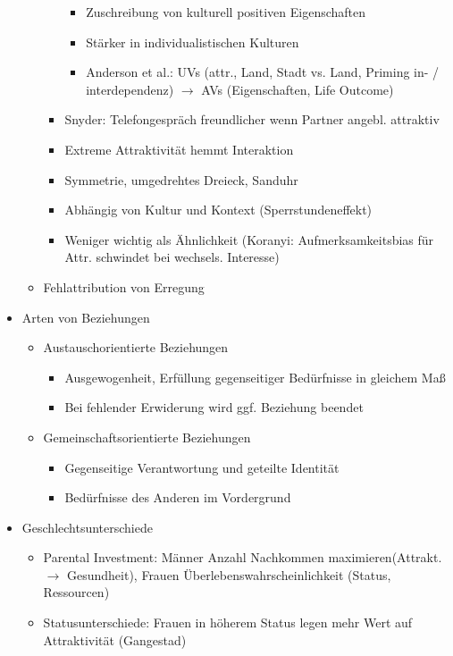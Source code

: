 \documentclass[11pt, paper=a4, twocolumn]{scrartcl}
\begin{document}
\begin{itemize}
\begin{itemize}
\begin{itemize}
\begin{itemize}
									\item Zuschreibung von kulturell positiven Eigenschaften
									\item Stärker in individualistischen Kulturen
									\item Anderson et al.: UVs (attr., Land, Stadt vs. Land, Priming 
										in- / interdependenz) $\rightarrow$ AVs (Eigenschaften, Life Outcome)
								\end{itemize}
							\item Snyder: Telefongespräch freundlicher wenn Partner angebl. attraktiv
							\item Extreme Attraktivität hemmt Interaktion
							\item Symmetrie, umgedrehtes Dreieck, Sanduhr
							\item Abhängig von Kultur und Kontext (Sperrstundeneffekt)
							\item Weniger wichtig als Ähnlichkeit (Koranyi: Aufmerksamkeitsbias für Attr. schwindet bei wechsels. Interesse)
						\end{itemize}
					\item Fehlattribution von Erregung
				\end{itemize}
			\item Arten von Beziehungen
				\begin{itemize}
					\item Austauschorientierte Beziehungen
						\begin{itemize}
							\item Ausgewogenheit, Erfüllung gegenseitiger Bedürfnisse in gleichem Maß
							\item Bei fehlender Erwiderung wird ggf. Beziehung beendet
						\end{itemize}
					\item Gemeinschaftsorientierte Beziehungen
						\begin{itemize}
							\item Gegenseitige Verantwortung und geteilte Identität
							\item Bedürfnisse des Anderen im Vordergrund
						\end{itemize}
				\end{itemize}
			\item Geschlechtsunterschiede
				\begin{itemize}
					\item Parental Investment: Männer Anzahl Nachkommen maximieren(Attrakt. $\rightarrow$ Gesundheit), Frauen 
						Überlebenswahrscheinlichkeit (Status, Ressourcen)
					\item Statusunterschiede: Frauen in höherem Status legen mehr Wert auf Attraktivität (Gangestad)

\end{itemize}
\end{itemize}
\end{document}
